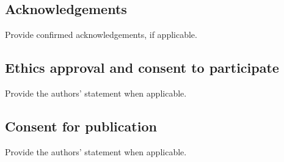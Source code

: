 \documentclass[11pt]{article}
\begin{document}
\subsection*{Acknowledgements}
Provide confirmed acknowledgements, if applicable.
\subsection*{Ethics approval and consent to participate}
Provide the authors' statement when applicable.
\subsection*{Consent for publication}
Provide the authors' statement when applicable.



\end{document}
